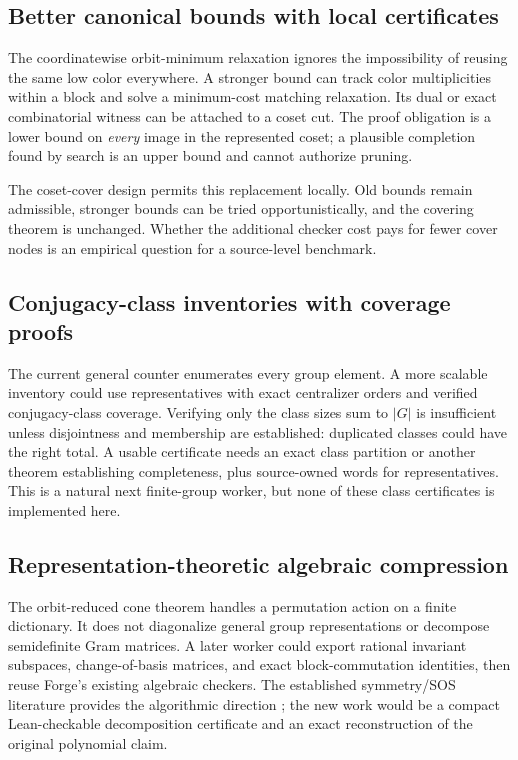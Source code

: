 \subsection{Better canonical bounds with local certificates}
The coordinatewise orbit-minimum relaxation ignores the impossibility of reusing the same low color everywhere. A stronger bound can track color multiplicities within a block and solve a minimum-cost matching relaxation. Its dual or exact combinatorial witness can be attached to a coset cut. The proof obligation is a lower bound on \emph{every} image in the represented coset; a plausible completion found by search is an upper bound and cannot authorize pruning.

The coset-cover design permits this replacement locally. Old bounds remain admissible, stronger bounds can be tried opportunistically, and the covering theorem is unchanged. Whether the additional checker cost pays for fewer cover nodes is an empirical question for a source-level benchmark.

\subsection{Conjugacy-class inventories with coverage proofs}
The current general counter enumerates every group element. A more scalable inventory could use representatives with exact centralizer orders and verified conjugacy-class coverage. Verifying only the class sizes sum to $|G|$ is insufficient unless disjointness and membership are established: duplicated classes could have the right total. A usable certificate needs an exact class partition or another theorem establishing completeness, plus source-owned words for representatives. This is a natural next finite-group worker, but none of these class certificates is implemented here.

\subsection{Representation-theoretic algebraic compression}
The orbit-reduced cone theorem handles a permutation action on a finite dictionary. It does not diagonalize general group representations or decompose semidefinite Gram matrices. A later worker could export rational invariant subspaces, change-of-basis matrices, and exact block-commutation identities, then reuse Forge's existing algebraic checkers. The established symmetry/SOS literature provides the algorithmic direction \cite{gatermann-parrilo}; the new work would be a compact Lean-checkable decomposition certificate and an exact reconstruction of the original polynomial claim.

